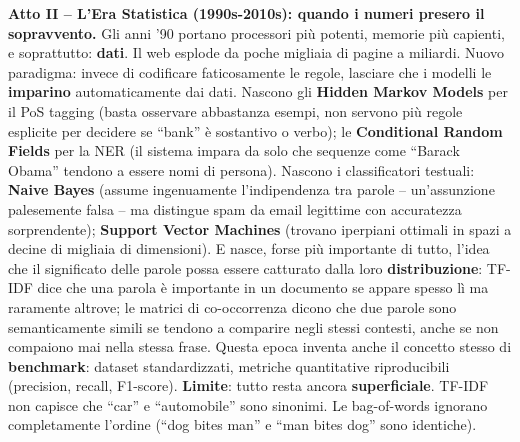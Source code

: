 \documentclass[12pt,a4paper]{article}
\begin{document}
\begin{defbox}
\textbf{Atto II -- L'Era Statistica (1990s-2010s): quando i numeri presero il sopravvento.}
Gli anni '90 portano processori pi\`u potenti, memorie pi\`u capienti, e soprattutto: \textbf{dati}. Il web esplode da poche migliaia di pagine a miliardi. Nuovo paradigma: invece di codificare faticosamente le regole, lasciare che i modelli le \textbf{imparino} automaticamente dai dati. Nascono gli \textbf{Hidden Markov Models} per il PoS tagging (basta osservare abbastanza esempi, non servono pi\`u regole esplicite per decidere se ``bank'' \`e sostantivo o verbo); le \textbf{Conditional Random Fields} per la NER (il sistema impara da solo che sequenze come ``Barack Obama'' tendono a essere nomi di persona). Nascono i classificatori testuali: \textbf{Naive Bayes} (assume ingenuamente l'indipendenza tra parole -- un'assunzione palesemente falsa -- ma distingue spam da email legittime con accuratezza sorprendente); \textbf{Support Vector Machines} (trovano iperpiani ottimali in spazi a decine di migliaia di dimensioni). E nasce, forse pi\`u importante di tutto, l'idea che il significato delle parole possa essere catturato dalla loro \textbf{distribuzione}: TF-IDF dice che una parola \`e importante in un documento se appare spesso l\`i ma raramente altrove; le matrici di co-occorrenza dicono che due parole sono semanticamente simili se tendono a comparire negli stessi contesti, anche se non compaiono mai nella stessa frase. Questa epoca inventa anche il concetto stesso di \textbf{benchmark}: dataset standardizzati, metriche quantitative riproducibili (precision, recall, F1-score). \textbf{Limite}: tutto resta ancora \textbf{superficiale}. TF-IDF non capisce che ``car'' e ``automobile'' sono sinonimi. Le bag-of-words ignorano completamente l'ordine (``dog bites man'' e ``man bites dog'' sono identiche).
\end{defbox}
\end{document}
